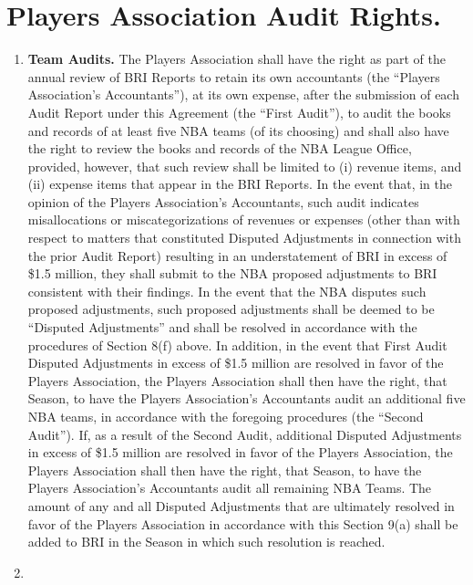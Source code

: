 \documentclass[
]{book}
\providecommand{\tightlist}{%
  \setlength{\itemsep}{0pt}\setlength{\parskip}{0pt}}
\begin{document}
\hypertarget{players-association-audit-rights.}{%
\section{Players Association Audit Rights.}\label{players-association-audit-rights.}}

\begin{enumerate}
\def\labelenumi{(\alph{enumi})}
\tightlist
\item
  \textbf{Team Audits.} The Players Association shall have the right as part of the annual review of BRI Reports to retain its own accountants (the ``Players Association's Accountants''), at its own expense, after the submission of each Audit Report under this Agreement (the ``First Audit''), to audit the books and records of at least five NBA teams (of its choosing) and shall also have the right to review the books and records of the NBA League Office, provided, however, that such review shall be limited to (i) revenue items, and (ii) expense items that appear in the BRI Reports. In the event that, in the opinion of the Players Association's Accountants, such audit indicates misallocations or miscategorizations of revenues or expenses (other than with respect to matters that constituted Disputed Adjustments in connection with the prior Audit Report) resulting in an understatement of BRI in excess of \$1.5 million, they shall submit to the NBA proposed adjustments to BRI consistent with their findings. In the event that the NBA disputes such proposed adjustments, such proposed adjustments shall be deemed to be ``Disputed Adjustments'' and shall be resolved in accordance with the procedures of Section 8(f) above. In addition, in the event that First Audit Disputed Adjustments in excess of \$1.5 million are resolved in favor of the Players Association, the Players Association shall then have the right, that Season, to have the Players Association's Accountants audit an additional five NBA teams, in accordance with the foregoing procedures (the ``Second Audit''). If, as a result of the Second Audit, additional Disputed Adjustments in excess of \$1.5 million are resolved in favor of the Players Association, the Players Association shall then have the right, that Season, to have the Players Association's Accountants audit all remaining NBA Teams. The amount of any and all Disputed Adjustments that are ultimately resolved in favor of the Players Association in accordance with this Section 9(a) shall be added to BRI in the Season in which such resolution is reached.
\item

\end{enumerate}
\end{document}

